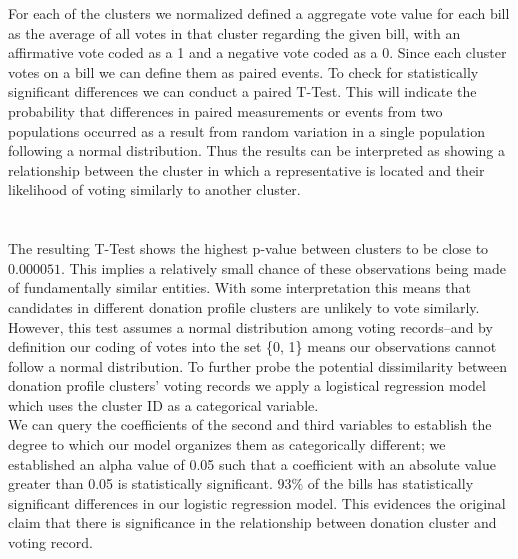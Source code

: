 \documentclass[journal]{IEEEtran}
\begin{document}
For each of the clusters we normalized defined a aggregate vote value for each bill as the average of all votes in that cluster regarding the given bill, with an affirmative vote coded as a 1 and a negative vote coded as a 0. Since each cluster votes on a bill we 
can define them as paired events. To check for statistically significant differences we can conduct a paired T-Test. This will indicate the probability that differences in paired measurements or events from two populations occurred as a result from random variation in a single population following a normal distribution. Thus the results can be interpreted as showing a 
relationship between the cluster in which a representative is located and their likelihood of voting similarly to another cluster.\\
\\\\
The resulting T-Test shows the highest p-value between clusters to be close to $0.000051$. This implies a relatively small chance of these observations being made of fundamentally similar entities. With some interpretation this means that candidates in different donation profile clusters are unlikely to vote similarly. However, this test 
assumes a normal distribution among voting records--and by definition our coding of votes into the set \{0, 1\} means our observations cannot follow a normal distribution. To further probe the potential dissimilarity between donation profile clusters' voting records we apply a logistical regression model which
uses the cluster ID as a categorical variable.\\ We can query the coefficients of the second and third variables to establish the degree to which our model organizes them as categorically different; we established an alpha value of 0.05 such that a coefficient with an absolute value greater than 0.05 is statistically significant. $93\%$ of the bills has statistically significant differences in our logistic regression model. This evidences the original claim that there is 
significance in the relationship between donation cluster and voting record.\\\\
\\\\
\end{document}
